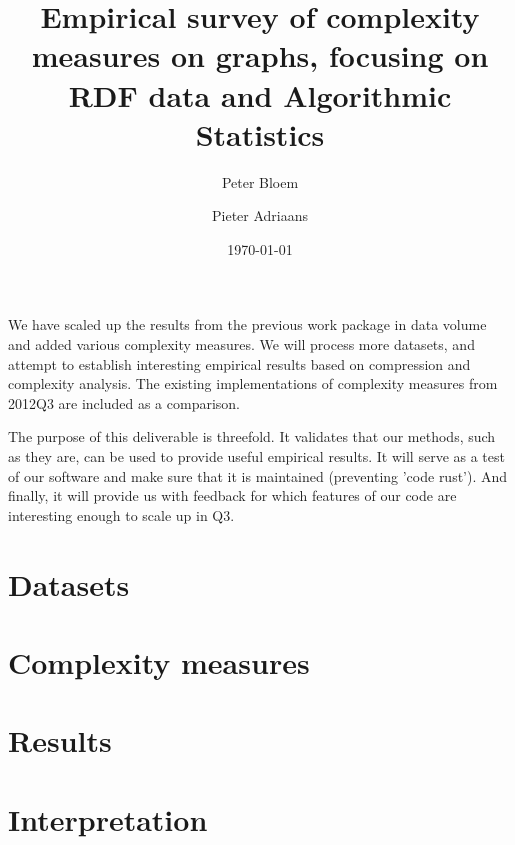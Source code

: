 \documentclass{article}
\author{Peter Bloem \and Pieter Adriaans}
\title{Empirical survey of complexity measures on graphs, focusing on RDF data and Algorithmic Statistics}
\date{\today}
\begin{document}
We have scaled up the results from the previous work package in data volume and added various complexity measures. We will process more datasets, and attempt to establish interesting empirical results based on compression and complexity analysis. The existing implementations of complexity measures from 2012Q3 are included as a comparison.

The purpose of this deliverable is threefold. It validates that our methods, such as they are, can be used to provide useful empirical results. It will serve as a test of our software and make sure that it is maintained (preventing 'code rust'). And finally, it will provide us with feedback for which features of our code are interesting enough to scale up in Q3.

\section{Datasets}

\section{Complexity measures}

\section{Results}

\section{Interpretation}
\end{document}
